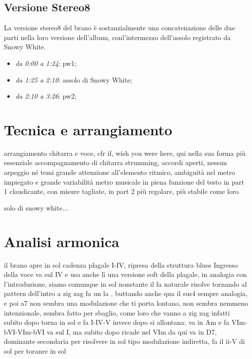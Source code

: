 \documentclass[class=book, crop=false, oneside, 12pt]{standalone}
\begin{document}
    \subsection{Versione Stereo8}
    La versione stereo8 del brano è sostanzialmente una concatenazione delle due parti nella loro versione dell'album, conl'intermezzo dell'assolo registrato da Snowy White. 

    \begin{itemize}
        \item \emph{da 0:00 a 1:24}: \acrlong{pw1};
        \item \emph{da 1:25 a 2:10}: assolo di Snowy White;
        \item \emph{da 2:10 a 3:26}: \acrlong{pw2};
    \end{itemize}

    \section{Tecnica e arrangiamento}
    arrangiamento chitarra e voce, cfr if, wish you were here, qui nella sua forma più essenziale
    accompagnamento di chitarra strumming, accordi aperti, nessun arpeggio né temi
    grande attenzione all'elemento ritmico, ambiguità nel metro impiegato e grande variabilità
    metro musicale in piena funzione del testo
    in part 1 claudicante, con misure tagliate, in part 2 più regolare, più stabile come loro

    solo di snowy white...

    \section{Analisi armonica}
    il brano apre in sol
    cadenza plagale I-IV, ripresa della struttura blues
    Ingresso della voce va sul IV e usa anche lì una versione soft della plagale, in analogia con l'introduzione, siamo comunque in sol nonstante il fa naturale
    risolve tornando al pattern dell'intro
    a zig zag fa un la , buttando anche qua il sus4 sempre analogia, e poi a7
    non sembra una modulazione che ti porta lontano, non sembra nemmeno intenzionale, sembra fatto per sbaglio, come loro che vanno a zig zag
    infatti subito dopo torna in sol e fa I-IV-V
    invece dopo si allontana: va in Am e fa VIm-bVI-VIm-bVI 
    va sul I, ma subito dopo ricade nel VIm
    da qui va in D7, dominante secondaria per risolvere in sol
    tipo modulazione indiretta, fa il ii-V di sol per toranre in sol
\end{document}
